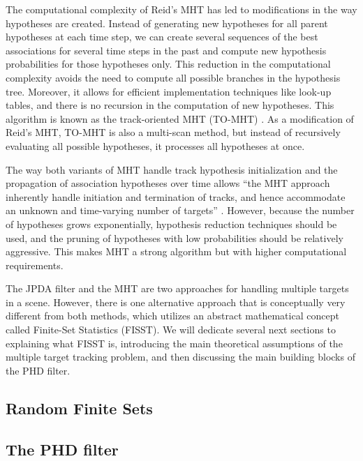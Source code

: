 The computational complexity of Reid's MHT has led to modifications in the way hypotheses are created. Instead of generating new hypotheses for all parent hypotheses at each time step, we can create several sequences of the best associations for several time steps in the past and compute new hypothesis probabilities for those hypotheses only. This reduction in the computational complexity avoids the need to compute all possible branches in the hypothesis tree. Moreover, it allows for efficient implementation techniques like look-up tables, and there is no recursion in the computation of new hypotheses. This algorithm is known as the track-oriented MHT (TO-MHT) \cite{werthmannStepbystepDescriptionComputationally1992}. As a modification of Reid's MHT, TO-MHT is also a multi-scan method, but instead of recursively evaluating all possible hypotheses, it processes all hypotheses at once.

The way both variants of MHT handle track hypothesis initialization and the propagation of association hypotheses over time allows ``the MHT approach inherently handle initiation and termination of tracks, and hence accommodate an unknown and time-varying number of targets'' \cite{voMultitargetTracking2015}. However, because the number of hypotheses grows exponentially, hypothesis reduction techniques should be used, and the pruning of hypotheses with low probabilities should be relatively aggressive. This makes MHT a strong algorithm but with higher computational requirements.

The JPDA filter and the MHT are two approaches for handling multiple targets in a scene. However, there is one alternative approach that is conceptually very different from both methods, which utilizes an abstract mathematical concept called Finite-Set Statistics (FISST). We will dedicate several next sections to explaining what FISST is, introducing the main theoretical assumptions of the multiple target tracking problem, and then discussing the main building blocks of the PHD filter.

\subsection{Random Finite Sets}
\subsection{The PHD filter}

